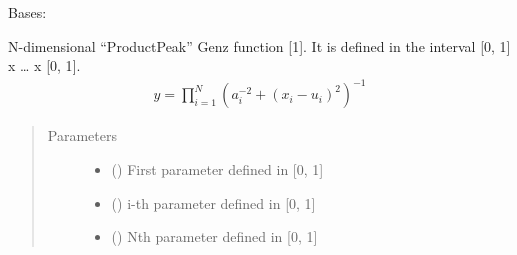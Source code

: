\documentclass[letterpaper,10pt,english,openany,oneside]{sphinxmanual}
\begin{document}

\begin{fulllineitems}
\label{\detokenize{pygpc.testfunctions:pygpc.testfunctions.testfunctions.GenzProductPeak}}
Bases: {\hyperref[\detokenize{pygpc:pygpc.AbstractModel.AbstractModel}]{}}

N-dimensional “ProductPeak” Genz function {[}1{]}. It is defined in the interval {[}0, 1{]} x … x {[}0, 1{]}.
\begin{equation*}
\begin{split}y = \prod_{i=1}^{N} \left( a_i^{-2} + (x_i - u_i)^2 \right)^{-1}\end{split}
\end{equation*}\begin{quote}\begin{description}
\item[{Parameters}] \leavevmode\begin{itemize}
\item {} 
\sphinxstyleliteralstrong{\sphinxupquote{{[}}}\sphinxstyleliteralstrong{\sphinxupquote{{]}}} (\sphinxstyleliteralemphasis{\sphinxupquote{ {[}}}\sphinxstyleliteralemphasis{\sphinxupquote{{]}}}) \textendash{} First parameter defined in {[}0, 1{]}

\item {} 
\sphinxstyleliteralstrong{\sphinxupquote{{[}}}\sphinxstyleliteralstrong{\sphinxupquote{{]}}} (\sphinxstyleliteralemphasis{\sphinxupquote{ {[}}}\sphinxstyleliteralemphasis{\sphinxupquote{{]}}}) \textendash{} i-th parameter defined in {[}0, 1{]}

\item {} 
\sphinxstyleliteralstrong{\sphinxupquote{{[}}}\sphinxstyleliteralstrong{\sphinxupquote{{]}}} (\sphinxstyleliteralemphasis{\sphinxupquote{ {[}}}\sphinxstyleliteralemphasis{\sphinxupquote{{]}}}) \textendash{} Nth parameter defined in {[}0, 1{]}


\end{itemize}
\end{description}
\end{quote}
\end{fulllineitems}
\end{document}
